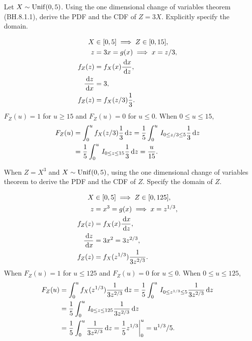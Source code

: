 \begin{exercise}
Let $X \sim \mathrm{Unif}(0, 5)$. Using the one dimensional change of variables theorem (BH.8.1.1),  derive the PDF and the CDF of $Z=3X$. Explicitly specify the domain.
\begin{solution}
  \begin{align}
X &\in [0, 5]  \implies Z \in [0, 15],\\
z &= 3x = g(x) \implies x = z/3, \\
f_{Z}(z) &= f_{X}(x) \frac{\,\textrm{d}x}{\,\textrm{d}z},\\
\frac{\,\textrm{d}z}{\,\textrm{d}x} &= 3,\\
f_{Z}(z) &= f_{X}(z/3) \frac{1}{3}.
  \end{align}
$F_{Z}(u) = 1$ for $u\geq 15$ and $F_{Z}(u) = 0$ for $u\leq 0$. When $0\leq u \leq 15$,
  \begin{align}
  F_{Z}(u) &= \int_{0}^{u} f_{X}(z/3) \frac{1}{3} \,\textrm{d}z = \frac{1}{5}\int_{0}^{u} \,I_{0\leq  z/3\leq 5}  \frac{1}{3} \,\textrm{d}z \\
&= \frac{1}{5}\int_{0}^{u} \,I_{0\leq z\leq 15}  \frac{1}{3} \,\textrm{d}z = \frac{u}{15}.
  \end{align}
\end{solution}
\end{exercise}


\begin{exercise}
When $Z=X^3$ and $X\sim \mathrm{Unif}(0,5)$, using the one dimensional change of variables theorem to  derive the PDF and the CDF of $Z$. Specify the domain of $Z$.
\begin{solution}
\begin{align}
X &\in [0, 5]  \implies Z \in [0, 125],\\
z &= x^{3} = g(x) \implies x = z^{1/3}, \\
f_{Z}(z) &= f_{X}(x) \frac{\,\textrm{d}x}{\,\textrm{d}z},\\
\frac{\,\textrm{d}z}{\,\textrm{d}x} &= 3 x^{2} = 3 z^{2/3},\\
f_{Z}(z) &= f_{X}(z^{1/3}) \frac{1}{3z^{2/3}}.
 \end{align}
When $F_{Z}(u) = 1$ for $u\leq 125$ and $F_{Z}(u) = 0$ for $u\leq 0$. When $0\leq u \leq 125$,
 \begin{align}
 F_{Z}(u) &= \int_{0}^{u} f_{X}(z^{1/3}) \frac{1}{3z^{2/3}} \,\textrm{d}z = \frac{1}{5}\int_{0}^{u} \,I_{0\leq  z^{1/3}\leq 5}  \frac{1}{3z^{2/3}} \,\textrm{d}z \\
&= \frac{1}{5}\int_{0}^{u} \,I_{0\leq z\leq 125}  \frac{1}{3z^{2/3}} \,\textrm{d}z \\
&= \frac{1}{5}\int_{0}^{u}  \frac{1}{3z^{2/3}} \,\textrm{d}z =  \frac{1}{5}z^{1/3}\biggr|_{0}^{u} = u^{1/3}/5.
 \end{align}
\end{solution}
\end{exercise}



